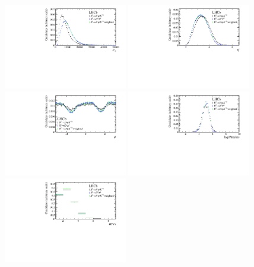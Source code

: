 \begin{figure}[tbp]
    \centering
    \includegraphics[width=0.48\textwidth]{09FlavourTagging/figs/pT_weighted.pdf}
    \includegraphics[width=0.48\textwidth]{09FlavourTagging/figs/eta_weighted.pdf}\\
    \includegraphics[width=0.48\textwidth]{09FlavourTagging/figs/phi_weighted.pdf}
    \includegraphics[width=0.48\textwidth]{09FlavourTagging/figs/nTracks_weighted.pdf}\\
    \includegraphics[width=0.48\textwidth]{09FlavourTagging/figs/nPV_weighted.pdf}

\end{figure}
